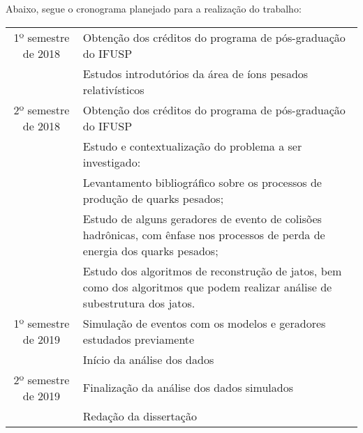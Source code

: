 Abaixo, segue o cronograma planejado para a realização do trabalho:

\begin{tabular}{|c|p{8cm}|}
  \hline
  1º semestre de 2018 & Obtenção dos créditos do programa de pós-graduação do IFUSP \\
		      & Estudos introdutórios da área de íons pesados relativísticos \\ \hline
  2º semestre de 2018 & Obtenção dos créditos do programa de pós-graduação do IFUSP \\
		      & Estudo e contextualização do problema a ser investigado: \\
		      & \tabitem Levantamento bibliográfico sobre os processos de produção de quarks pesados; \\
		      & \tabitem Estudo de alguns geradores de evento de colisões hadrônicas, com ênfase nos processos de perda de energia dos quarks pesados; \\
		      & \tabitem Estudo dos algoritmos de reconstrução de jatos, bem como dos algoritmos que podem realizar análise de subestrutura dos jatos. \\ \hline
  1º semestre de 2019 & Simulação de eventos com os modelos e geradores estudados previamente \\
  		      & Início da análise dos dados \\ \hline
  2º semestre de 2019 & Finalização da análise dos dados simulados \\
  		      & Redação da dissertação \\ \hline
\end{tabular}
